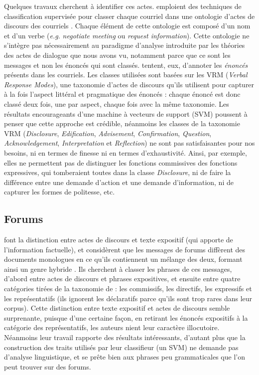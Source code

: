 \documentclass[10pt,a4paper,twoside]{article}
\begin{document}
Quelques travaux cherchent à identifier ces actes. \citet{cohen2004learning} emploient des techniques de classification supervisée pour classer chaque courriel dans une ontologie d'\og actes de discours des courriels \fg. Chaque élément de cette ontologie est composé d'un nom et d'un verbe (\textit{e.g.} \textit{negotiate meeting} ou \textit{request information}). Cette ontologie ne s'intègre pas nécessairement au paradigme d'analyse introduite par les théories des actes de dialogue que nous avons vu, notamment parce que ce sont les messages et non les énoncés qui sont classés. \citet{lampert2006classifying} tentent, eux, d'annoter les \textit{énoncés} présents dans les courriels. Les classes utilisées sont basées sur les VRM (\textit{Verbal Response Modes}), une taxonomie d'actes de discours qu'ils utilisent pour capturer à la fois l'aspect littéral et pragmatique des énoncés : chaque énoncé est donc classé deux fois, une par aspect, chaque fois avec la même taxonomie. Les résultats encourageants d'une machine à vecteurs de support (SVM) poussent \citeauthor{lampert2006classifying} à penser que cette approche est crédible, néanmoins les classes de la taxonomie VRM (\textit{Disclosure}, \textit{Edification}, \textit{Advisement}, \textit{Confirmation}, \textit{Question}, \textit{Acknowledgement}, \textit{Interpretation} et \textit{Reflection}) ne sont pas satisfaisantes pour nos besoins, ni en termes de finesse ni en termes d'exhaustivité. Ainsi, par exemple, elles ne permettent pas de distinguer les fonctions commissives des fonctions expressives, qui tomberaient toutes dans la classe \textit{Disclosure}, ni de faire la différence entre une demande d'action et une demande d'information, ni de capturer les formes de politesse, etc.

\subsection{Forums}
\label{subsec:forums}

\citet{qadir2011classifying} font la distinction entre actes de discours et texte expositif (qui apporte de l'information factuelle), et considèrent que les messages de forums diffèrent des documents monologues en ce qu'ils contiennent un mélange des deux, formant ainsi un genre \og hybride \fg. Ils cherchent à classer les phrases de ces messages, d'abord entre actes de discours et phrases expositives, et ensuite entre quatre catégories tirées de la taxonomie de \citet{searle1976taxonomy} : les commissifs, les directifs, les expressifs et les représentatifs (ils ignorent les déclaratifs parce qu'ils sont trop rares dans leur corpus). Cette distinction entre texte expositif et actes de discours semble surprenante, puisque d'une certaine façon, en retirant les énoncés expositifs à la catégorie des représentatifs, les auteurs nient leur caractère illocutoire. Néanmoins leur travail rapporte des résultats intéressants, d'autant plus que la construction des traits utilisés par leur classifieur (un SVM) ne demande pas d'analyse linguistique, et se prête bien aux phrases peu grammaticales que l'on peut trouver sur des forums.
\end{document}
